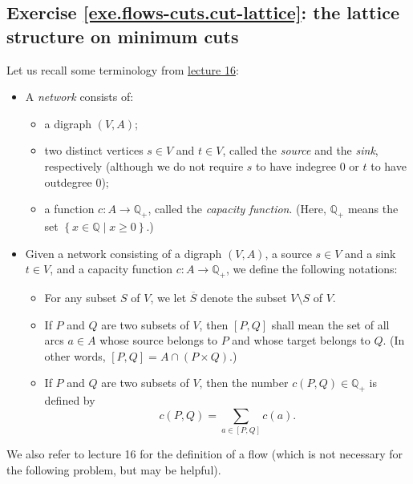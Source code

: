 \documentclass[numbers=enddot,12pt,final,onecolumn,notitlepage]{scrartcl}%
\theoremstyle{definition}
\let\sumnonlimits\sum
\renewcommand{\sum}{\sumnonlimits\limits}
\newcommand{\QQ}{\mathbb{Q}}
\newcommand{\set}[1]{\left\{ #1 \right\}}
\newcommand{\tup}[1]{\left( #1 \right)}
\newcommand{\ive}[1]{\left[ #1 \right]}
\begin{document}
\subsection{Exercise \ref{exe.flows-cuts.cut-lattice}: the
lattice structure on minimum cuts}

Let us recall some terminology from
\href{http://www-users.math.umn.edu/~dgrinber/5707s17/5707lec16.pdf}{lecture 16}:

\begin{itemize}
\item A \textit{network} consists of:
      \begin{itemize}
      \item a digraph $\tup{V, A}$;
      \item two distinct vertices $s \in V$ and $t \in V$,
            called the \textit{source} and the \textit{sink},
            respectively (although we do not require $s$ to
            have indegree $0$ or $t$ to have outdegree $0$);
      \item a function $c : A \to \QQ_+$, called the
            \textit{capacity function}.
            (Here, $\QQ_+$ means the set
            $\set{ x \in \QQ \mid x \geq 0 }$.)
      \end{itemize}

\item Given a network consisting of a digraph
      $\tup{V, A}$, a source $s \in V$ and a sink $t \in V$,
      and a capacity function $c : A \to \QQ_+$, we define
      the following notations:
      \begin{itemize}
      \item For any subset $S$ of $V$, we let $\overline{S}$
            denote the subset $V \setminus S$ of $V$.
      \item If $P$ and $Q$ are two subsets of $V$, then
            $\ive{P, Q}$ shall mean the set of all arcs
            $a \in A$ whose source belongs to $P$ and whose
            target belongs to $Q$.
            (In other words,
            $\ive{P, Q} = A \cap \tup{P \times Q}$.)
      \item If $P$ and $Q$ are two subsets of $V$, then the
            number $c \tup{P, Q} \in \QQ_+$ is defined by
            \[
            c \tup{P, Q} = \sum_{a \in \ive{P, Q}} c \tup{a} .
            \]
      \end{itemize}
\end{itemize}

We also refer to lecture 16 for the definition of a flow
(which is not necessary for the following problem, but may
be helpful).
\end{document}
